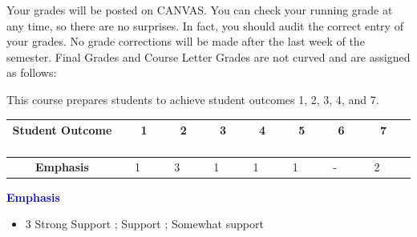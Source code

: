 \documentclass[letterpaper]{inzane_syllabus} %
\begin{document}
Your grades will be posted on CANVAS. You can check your running grade at any time, so there are no surprises. In fact, you should audit the correct entry of your grades. No grade corrections will be made after the last week of the semester. Final Grades and Course Letter Grades are not curved and are assigned as follows:
\begin{center}
\end{center}
\vspace{0.2 cm}
\noindent This course prepares students to achieve student outcomes 1, 2, 3, 4, and 7.\\

\begin{center}
\begin{tabular}{ |c| c| c| c| c| c| c| c| }\hline
 \textbf{Student Outcome} \ & \ \ \textbf{1} \ & \ \ \textbf{2} \ & \ \ \textbf{3} \ & \ \ \textbf{4}  \ & \ \ \textbf{5} \ &\ \ \textbf{6} \ &\ \ \textbf{7} \ \ \\  \hline
 \textbf{Emphasis} & 1 & 3 & 1 & 1 & 1 & - & 2&\hline
\end{tabular}
\end{center}

\noindent \textbf{\textcolor{blue}{Emphasis}}
\begin{itemize}
    \item 3 Strong Support ;  Support ;  Somewhat support
\end{itemize}
\end{document}
